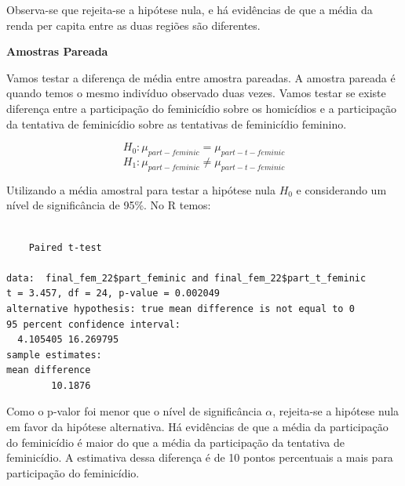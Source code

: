 \documentclass[
  letterpaper,
  DIV=11,
  numbers=noendperiod]{scrreprt}
\newenvironment{Shaded}{\begin{snugshade}}{\end{snugshade}}
\newcommand{\AttributeTok}[1]{\textcolor[rgb]{0.40,0.45,0.13}{#1}}
\newcommand{\ConstantTok}[1]{\textcolor[rgb]{0.56,0.35,0.01}{#1}}
\newcommand{\FloatTok}[1]{\textcolor[rgb]{0.68,0.00,0.00}{#1}}
\newcommand{\FunctionTok}[1]{\textcolor[rgb]{0.28,0.35,0.67}{#1}}
\newcommand{\NormalTok}[1]{\textcolor[rgb]{0.00,0.23,0.31}{#1}}
\newcommand{\SpecialCharTok}[1]{\textcolor[rgb]{0.37,0.37,0.37}{#1}}
\newcommand{\StringTok}[1]{\textcolor[rgb]{0.13,0.47,0.30}{#1}}
\begin{document}
Observa-se que rejeita-se a hipótese nula, e há evidências de que a
média da renda per capita entre as duas regiões são diferentes.

\textbf{Amostras Pareada}

Vamos testar a diferença de média entre amostra pareadas. A amostra
pareada é quando temos o mesmo indivíduo observado duas vezes. Vamos
testar se existe diferença entre a participação do feminicídio sobre os
homicídios e a participação da tentativa de feminicídio sobre as
tentativas de feminicídio feminino.

\[H_0: \mu_{part-feminic} = \mu_{part-t-feminic}\]
\[H_1: \mu_{part-feminic} \neq \mu_{part-t-feminic}\]

Utilizando a média amostral para testar a hipótese nula \(H_0\) e
considerando um nível de significância de 95\%. No R temos:

\begin{Shaded}
\end{Shaded}

\begin{verbatim}

    Paired t-test

data:  final_fem_22$part_feminic and final_fem_22$part_t_feminic
t = 3.457, df = 24, p-value = 0.002049
alternative hypothesis: true mean difference is not equal to 0
95 percent confidence interval:
  4.105405 16.269795
sample estimates:
mean difference 
        10.1876 
\end{verbatim}

Como o p-valor foi menor que o nível de significância \(\alpha\),
rejeita-se a hipótese nula em favor da hipótese alternativa. Há
evidências de que a média da participação do feminicídio é maior do que
a média da participação da tentativa de feminicídio. A estimativa dessa
diferença é de 10 pontos percentuais a mais para participação do
feminicídio.
\end{document}
